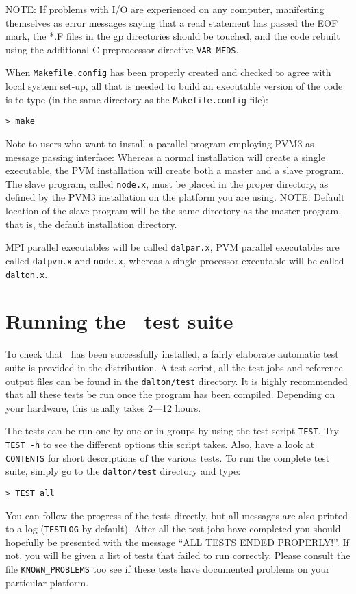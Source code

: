 NOTE: If problems with I/O are experienced on
any computer,
manifesting themselves as error messages saying that a read statement
has passed the EOF mark, the *.F files in the gp directories should be
touched, and the code rebuilt using the additional C preprocessor
directive \verb|VAR_MFDS|.

When  \verb|Makefile.config| has been properly
created and checked
to agree with local system set-up, all that is needed
to build an executable version of the
code is to type
(in the same directory as the \verb|Makefile.config| file):
\begin{verbatim}
> make
\end{verbatim}
Note to users who want to install a parallel program employing PVM3
as message passing interface: Whereas a normal installation will
create a single executable, the PVM installation will
create both a master and a slave
program.
The slave program, called \verb|node.x|, must be placed in  the
proper directory, as defined by the PVM3 installation on the
platform you are using. NOTE: Default location of the slave program
will be the same directory as the master program, that is, the default
installation directory.

MPI parallel executables will be called \verb|dalpar.x|, PVM parallel
executables are called \verb|dalpvm.x| and \verb|node.x|, whereas a
single-processor executable will be called \verb|dalton.x|.

\section{Running the \dalton\ test
suite}\label{sec:testsuite}

To check that \dalton\ has been successfully installed, a fairly
elaborate automatic test suite is provided in the distribution. A test
script, all the test jobs and reference output files can be found in
the \verb|dalton/test| directory. It is highly recommended that all
these tests be run once the program has been compiled. Depending on
your hardware, this usually takes 2---12 hours.

The tests can be run one by one or in groups by using the test script
\verb|TEST|. Try \verb|TEST -h| to see the different options this
script takes. Also, have a look at \verb|CONTENTS|
for short descriptions of the various tests. To run the
complete test suite, simply go to the \verb|dalton/test| directory and
type:
\begin{verbatim}
> TEST all
\end{verbatim}
You can follow the progress of the tests directly, but all messages
are also printed to a log (\verb|TESTLOG| by default). After all the
test jobs have completed you should hopefully be presented with the
message ``ALL TESTS ENDED PROPERLY!''. If not, you will be given a
list of tests that failed to run correctly. Please consult the file
\verb|KNOWN_PROBLEMS| too see if these tests have documented problems
on your particular platform.

